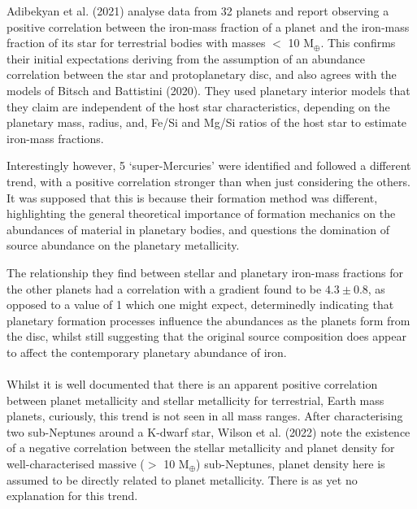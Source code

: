 \documentclass[a4paper,twocolumn,12pt]{article}
\begin{document}

Adibekyan et al. (2021)\cite{Adibekyan} analyse data from 32 planets and report observing a positive correlation between the iron-mass fraction of a planet and the iron-mass fraction of its star for terrestrial bodies with masses $<$ 10 M$_{\oplus}$. This confirms their initial expectations deriving from the assumption of an abundance correlation between the star and protoplanetary disc, and also agrees with the models of Bitsch and Battistini (2020). They used planetary interior models that they
claim are independent of the host star characteristics, depending on the planetary mass, radius, and, Fe/Si and Mg/Si ratios of the host star \cite{SussyInteriorModelsSuper-EarthsAndSub-Neptunes} to estimate iron-mass fractions.

Interestingly however, 
5 `super-Mercuries' were identified and followed a different trend, with a positive correlation stronger than when just considering the others. It was supposed that this is because their formation method was different, highlighting the general theoretical importance of formation mechanics on the abundances of material in planetary bodies, and questions the domination of source abundance on the planetary metallicity.

The relationship they find between stellar and planetary iron-mass fractions for the other planets had a correlation with a gradient found to be $4.3\pm0.8$, as opposed to a value of 1 which one might expect, determinedly indicating that planetary formation processes influence the abundances as the planets form from the disc, whilst still suggesting that the original source composition does appear to affect the contemporary planetary abundance of iron.
%
%
\\\\Whilst it is well documented that there is an apparent positive correlation between planet metallicity and stellar metallicity for terrestrial, Earth mass planets, curiously, this trend is not seen in all mass ranges. After characterising two sub-Neptunes around a K-dwarf star, Wilson et al. (2022) \cite{Wilson} note the existence of a negative correlation between the stellar metallicity and planet density for well-characterised massive ($>$ 10 M$_{\oplus}$) sub-Neptunes, planet density here is assumed to be directly related to planet metallicity. There is as yet no explanation for this trend.
\end{document}
